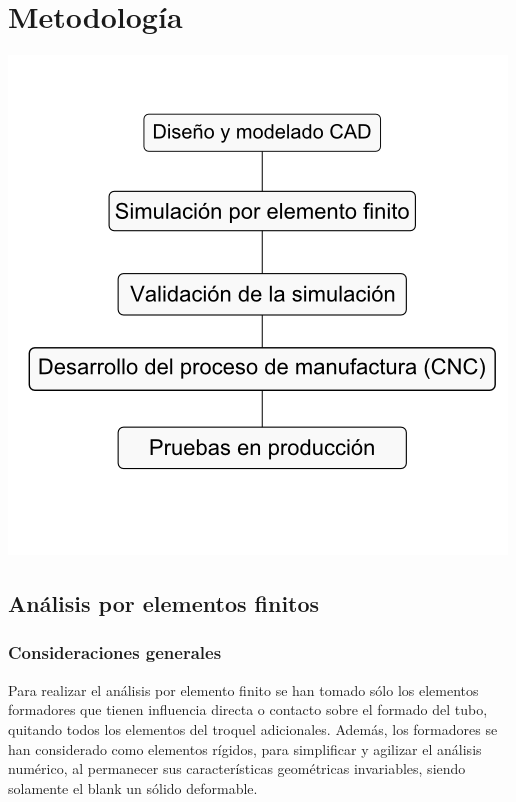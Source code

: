 \chapter{Metodología}

\begin{center}
\includegraphics[scale=0.75]{src/ch3/diagrama_metodologia.png}
\label{fig:diagrama_metodologia}
\end{center}

\section{Análisis por elementos finitos}

\subsection{Consideraciones generales}

Para realizar el análisis por elemento finito se han tomado sólo los elementos formadores que 
tienen influencia directa o contacto sobre el formado del tubo, quitando todos los elementos 
del troquel adicionales. Además, los formadores se han considerado como elementos rígidos, 
para simplificar y agilizar el análisis numérico, al permanecer sus características geométricas 
invariables, siendo solamente el blank un sólido deformable.

